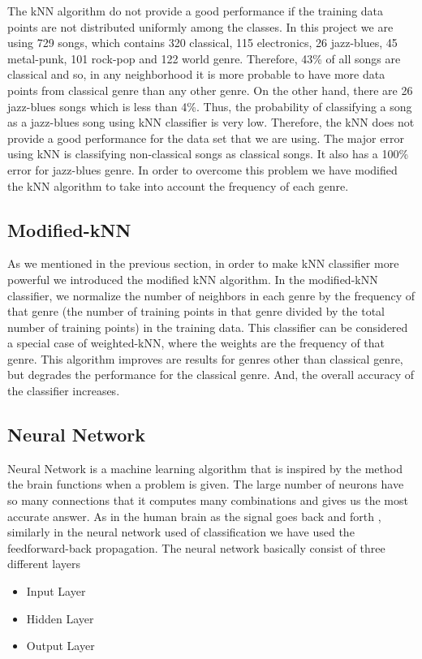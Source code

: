 \documentclass[12pt]{article}
\begin{document}
The kNN algorithm do not provide a good performance if the training data points are not distributed uniformly among the classes. In this project we are using 729 songs, which contains 320 classical, 115 electronics, 26 jazz-blues, 45 metal-punk, 101 rock-pop and 122 world genre. Therefore, 43\% of all songs are classical and so, in any neighborhood it is more probable to have more data points from classical genre than any other genre. On the other hand, there are 26 jazz-blues songs which is less than 4\%. Thus, the probability of classifying a song as a jazz-blues song using kNN classifier is very low. Therefore, the kNN does not provide a good performance for the data set that we are using. The major error using kNN is classifying non-classical songs as classical songs. It also has a 100\% error for jazz-blues genre. In order to overcome this problem we have modified the kNN algorithm to take into account the frequency of each genre.

\subsection{Modified-kNN}
As we mentioned in the previous section, in order to make kNN classifier more powerful we introduced the modified kNN algorithm. In the modified-kNN classifier, we normalize the number of neighbors in each genre by the frequency of that genre (the number of training points in that genre divided by the total number of training points) in the training data. This classifier can be considered a special case of weighted-kNN, where the weights are the frequency of that genre. This algorithm improves are results for genres other than classical genre, but degrades the performance for the classical genre. And, the overall accuracy of the classifier increases.

\subsection{Neural Network}
Neural Network is a machine learning algorithm that is inspired by the method the brain functions when a problem is given. The large number of neurons have so many connections that it computes many combinations and gives us the most accurate answer.
As in the human brain as the signal goes back and forth , similarly in the neural network used of classification we have used the feedforward-back propagation.
The neural network basically consist of three different layers
\begin{itemize}
  \item Input Layer
  \item Hidden Layer
   \item Output Layer
\end{itemize}
\end{document}
